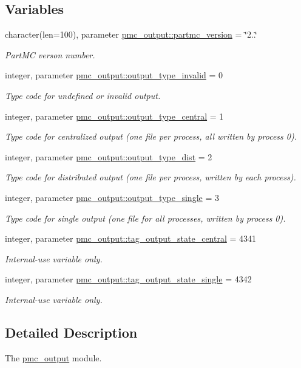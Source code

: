 \subsection*{Variables}
\begin{DoxyCompactItemize}
\item 
character(len=100), parameter \mbox{\hyperlink{namespacepmc__output_a5e58f12b9a77a18071fb7de24524848f}{pmc\+\_\+output\+::partmc\+\_\+version}} = \char`\"{}2..\char`\"{}
\begin{DoxyCompactList}\small\item\em Part\+MC verson number. \end{DoxyCompactList}\item 
integer, parameter \mbox{\hyperlink{namespacepmc__output_a3802b8c5d6df146ecc2dd6d5094b122f}{pmc\+\_\+output\+::output\+\_\+type\+\_\+invalid}} = 0
\begin{DoxyCompactList}\small\item\em Type code for undefined or invalid output. \end{DoxyCompactList}\item 
integer, parameter \mbox{\hyperlink{namespacepmc__output_aab24776fdca2884a7d5886a3f772fe4d}{pmc\+\_\+output\+::output\+\_\+type\+\_\+central}} = 1
\begin{DoxyCompactList}\small\item\em Type code for centralized output (one file per process, all written by process 0). \end{DoxyCompactList}\item 
integer, parameter \mbox{\hyperlink{namespacepmc__output_a83a7b3e4fe2b85b24c022d230fa0d012}{pmc\+\_\+output\+::output\+\_\+type\+\_\+dist}} = 2
\begin{DoxyCompactList}\small\item\em Type code for distributed output (one file per process, written by each process). \end{DoxyCompactList}\item 
integer, parameter \mbox{\hyperlink{namespacepmc__output_af747821e7522d6b0c5217faa79fc1b01}{pmc\+\_\+output\+::output\+\_\+type\+\_\+single}} = 3
\begin{DoxyCompactList}\small\item\em Type code for single output (one file for all processes, written by process 0). \end{DoxyCompactList}\item 
integer, parameter \mbox{\hyperlink{namespacepmc__output_af6ce65b9d2ef20e03fc0ed4a4b478a44}{pmc\+\_\+output\+::tag\+\_\+output\+\_\+state\+\_\+central}} = 4341
\begin{DoxyCompactList}\small\item\em Internal-\/use variable only. \end{DoxyCompactList}\item 
integer, parameter \mbox{\hyperlink{namespacepmc__output_a7385761091e132dc082a72fa05a83180}{pmc\+\_\+output\+::tag\+\_\+output\+\_\+state\+\_\+single}} = 4342
\begin{DoxyCompactList}\small\item\em Internal-\/use variable only. \end{DoxyCompactList}\end{DoxyCompactItemize}


\subsection{Detailed Description}
The \mbox{\hyperlink{namespacepmc__output}{pmc\+\_\+output}} module. 

